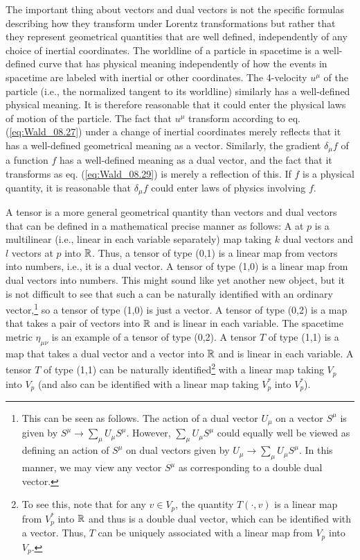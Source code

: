 The important thing about vectors and dual vectors is not the specific formulas describing how they transform under Lorentz transformations but rather that they represent geometrical quantities that are well defined, independently of any choice of inertial coordinates. The worldline of a particle in spacetime is a well-defined curve that has physical meaning independently of how the events in spacetime are labeled with inertial or other coordinates. The 4-velocity $u^\mu$ of the particle (i.e., the normalized tangent to its worldline) similarly has a well-defined physical meaning. It is therefore reasonable that it could enter the physical laws of motion of the particle. The fact that $u^\mu$ transform according to eq. (\ref{eq:Wald_08.27}) under a change of inertial coordinates merely reflects that it has a well-defined geometrical meaning as a vector. Similarly, the gradient $\delta_\mu f$ of a function $f$ has a well-defined meaning as a dual vector, and the fact that it transforms as eq. (\ref{eq:Wald_08.29}) is merely a reflection of this. If $f$ is a physical quantity, it is reasonable that $\delta_\mu f$ could enter laws of physics involving $f$.

A tensor is a more general geometrical quantity than vectors and dual vectors that can be defined in a mathematical precise manner as follows: A  at $p$ is a multilinear (i.e., linear in each variable separately) map taking $k$ dual vectors and $l$ vectors at $p$ into $\mathbb{R}$. Thus, a tensor of type (0,1) is a linear map from vectors into numbers, i.e., it is a dual vector. A tensor of type (1,0) is a linear map from dual vectors into numbers. This might sound like yet another new object, but it is not difficult to see that such a  can be naturally identified with an ordinary vector,\footnote{This can be seen as follows. The action of a dual vector $U_\mu$ on a vector $S^\mu$ is given by $S^\mu \rightarrow \sum_\mu U_\mu S^\mu$. However, $\sum_\mu U_\mu S^\mu$ could equally well be viewed as defining an action of $S^\mu$ on dual vectors given by $U_\mu \rightarrow \sum_\mu U_\mu S^\mu$. In this manner, we may view any vector $S^\mu$ as corresponding to a double dual vector.} 
so a tensor of type (1,0) is just a vector. A tensor of type (0,2) is a map that takes a pair of vectors into $\mathbb{R}$ and is linear in each variable. The spacetime metric $\eta_{\mu\nu}$ is an example of a tensor of type (0,2). A tensor $T$ of type (1,1) is a map that takes a dual vector and a vector into $\mathbb{R}$ and is linear in each variable. A tensor $T$ of type (1,1) can be naturally identified\footnote{
To see this, note that for any $v \in V_p$, the quantity $T(\cdot, v)$ is a linear map from $V^*_p$ into $\mathbb{R}$ and thus is a double dual vector, which can be identified with a vector. Thus, $T$ can be uniquely associated with a linear map from $V_p$ into $V_p$.} 
with a linear map taking $V_p$ into $V_p$ (and also can be identified with a linear map taking $V^*_p$ into $V^*_p$). 

